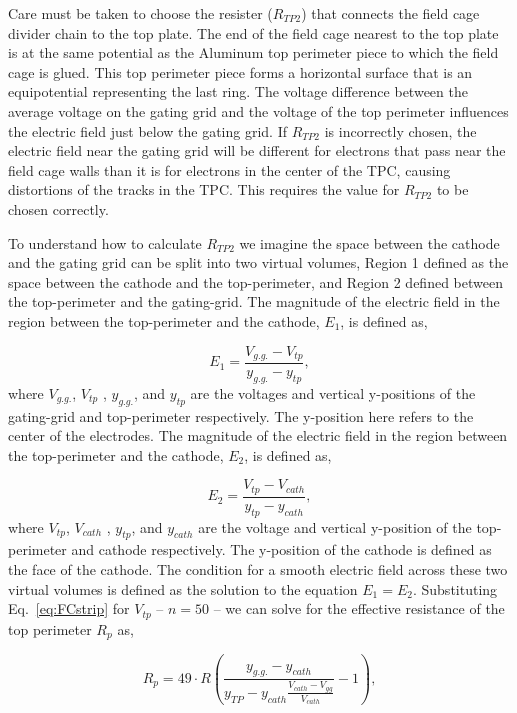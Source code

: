Care must be taken to choose the resister ($R_{TP2}$) that connects the field cage divider chain to the top plate. The end of the field cage nearest to the top plate is at the same potential as the Aluminum top perimeter piece to which the field cage is glued. This top perimeter piece forms a horizontal surface that is an equipotential representing the last ring. The voltage difference between the average voltage on  the gating grid and the voltage of the top perimeter influences the electric field just below the gating grid. If $R_{TP2}$ is incorrectly chosen, the electric field near the gating grid will be different for electrons that pass near the field cage walls than it is for electrons in the center of the TPC,  causing distortions of the tracks in the TPC. This requires the value for $R_{TP2}$ to be chosen correctly. 

To understand how to calculate $R_{TP2}$ we imagine the space between the cathode and the gating grid can be split into two virtual volumes, Region 1 defined as the space between the cathode and the top-perimeter, and Region 2 defined between the top-perimeter and the gating-grid. The magnitude of the electric field in the region between the top-perimeter and the cathode, $E_1$, is defined as,

\begin{equation}
E_1 = \frac{V_{g.g.} - V_{tp}}{ y_{g.g.} - y_{tp} },
\end{equation}
where  $V_{g.g.}$, $V_{tp}$ , $y_{g.g.}$, and $y_{tp}$ are the voltages and vertical y-positions of the gating-grid and top-perimeter respectively. The y-position here refers to the center of the electrodes. The magnitude of the electric field in the region between the top-perimeter and the cathode, $E_2$, is defined as,

\begin{equation}
E_2 = \frac{V_{tp} - V_{cath}}{ y_{tp} - y_{cath} },
\end{equation}
where  $V_{tp}$, $V_{cath}$ , $y_{tp}$, and $y_{cath}$ are the voltage and vertical y-position of the top-perimeter and cathode respectively. The y-position of the cathode is defined as the face of the cathode. The condition for a smooth electric field across these two virtual volumes is defined as the solution to the equation $E_1 = E_2$. Substituting Eq.~\ref{eq:FCstrip} for $V_{tp}$ -- $n=50$ -- we can solve for the effective resistance of the top perimeter $R_p$ as, 

\begin{equation}
R_p = 49 \cdot R  \left(\frac{ y_{g.g.} - y_{cath} }{ y_{TP} - y_{cath} \frac{V_{cath} - V_{gg}}{V_{cath}} }- 1 \right),
\label{eq:TP_resistor}
\end{equation}

